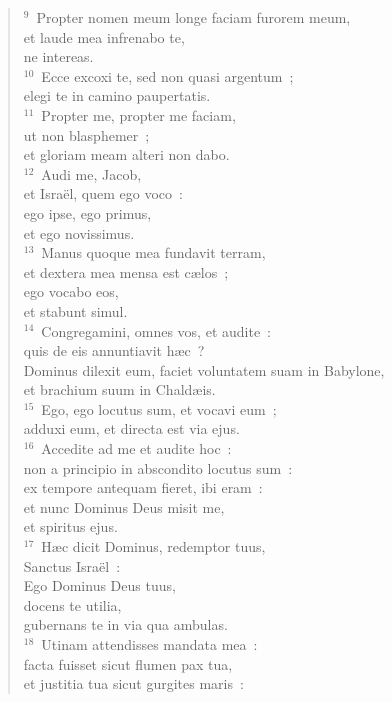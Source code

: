 \begin{flushleft}
\begin{verse}
${}^{9}$~Propter nomen meum longe faciam furorem meum,\\ et laude mea infrenabo te,\\ ne intereas.\\
${}^{10}$~Ecce excoxi te, sed non quasi argentum~;\\ elegi te in camino paupertatis.\\
${}^{11}$~Propter me, propter me faciam,\\ ut non blasphemer~;\\ et gloriam meam alteri non dabo.\\
${}^{12}$~Audi me, Jacob,\\ et Isra\"el, quem ego voco~:\\ ego ipse, ego primus,\\ et ego novissimus.\\
${}^{13}$~Manus quoque mea fundavit terram,\\ et dextera mea mensa est c\ae los~;\\ ego vocabo eos,\\ et stabunt simul.\\
${}^{14}$~Congregamini, omnes vos, et audite~:\\ quis de eis annuntiavit h\ae c~?\\ Dominus dilexit eum, faciet voluntatem suam in Babylone,\\ et brachium suum in Chald\ae is.\\
${}^{15}$~Ego, ego locutus sum, et vocavi eum~;\\ adduxi eum, et directa est via ejus.\\
${}^{16}$~Accedite ad me et audite hoc~:\\ non a principio in abscondito locutus sum~:\\ ex tempore antequam fieret, ibi eram~:\\ et nunc Dominus Deus misit me,\\ et spiritus ejus.\\
${}^{17}$~H\ae c dicit Dominus, redemptor tuus,\\ Sanctus Isra\"el~:\\ Ego Dominus Deus tuus,\\ docens te utilia,\\ gubernans te in via qua ambulas.\\
${}^{18}$~Utinam attendisses mandata mea~:\\ facta fuisset sicut flumen pax tua,\\ et justitia tua sicut gurgites maris~:\\

\end{verse}
\end{flushleft}
